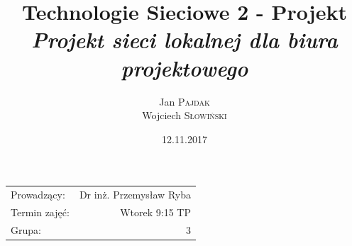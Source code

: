 \documentclass{article}
\title{Technologie Sieciowe 2 - Projekt \\ \textit{Projekt sieci lokalnej dla biura projektowego}} %
\author{Jan \textsc{Pajdak} \\ Wojciech \textsc{Słowiński}} %
\date{12.11.2017} %
\begin{document}
\maketitle %

\begin{center}
\begin{tabular}{l r}
Prowadzący: & Dr inż. Przemysław Ryba \\
Termin zajęć: & Wtorek 9:15 TP \\
Grupa: & 3 
\end{tabular}
\end{center}

\tableofcontents %






\end{document}
